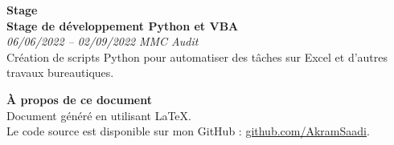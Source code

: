 \documentclass[a4paper,11pt]{article}
\newcommand{\cvsection}[1]{\vspace{1em}\noindent\textbf{\textcolor{cvhighlight}{\LARGE #1}}\vspace{0.5em}\\}
\newcommand{\cvevent}[3]{\textbf{#1} \\ \textit{#2} \hfill \textit{#3} \vspace{0.5em}}
\begin{document}
\begin{paracol}{2}
\colorbox{sectionbg1}{
    \parbox{\linewidth}{
        \cvsection{\faLaptopCode \hspace{0.5em} Stage}
        \cvevent{Stage de développement Python et VBA}{06/06/2022 – 02/09/2022}{MMC Audit} \\
        Création de scripts Python pour automatiser des tâches sur Excel et d'autres travaux bureautiques.
    }
}
\medskip

\colorbox{sectionbg2}{
    \parbox{\linewidth}{
        \cvsection{\faFileCode \hspace{0.5em} À propos de ce document}
        Document généré en utilisant \LaTeX. \\
        Le code source est disponible sur mon GitHub : \href{https://github.com/AkramSaadi}{github.com/AkramSaadi}.
    }
}

\end{paracol}
\end{document}
